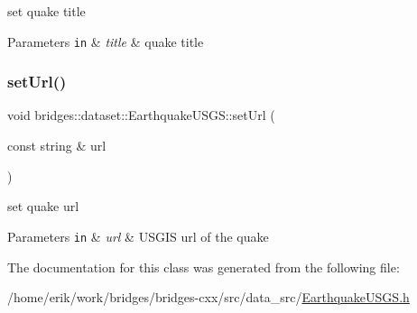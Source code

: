 set quake title 


\begin{DoxyParams}[1]{Parameters}
\mbox{\tt in}  & {\em title} & quake title \\
\hline
\end{DoxyParams}
\mbox{\label{classbridges_1_1dataset_1_1_earthquake_u_s_g_s_aecb3cb7e4dba2315fed2a4a316a1fac9}} 
\subsubsection{\texorpdfstring{set\+Url()}{setUrl()}}
{\footnotesize\ttfamily void bridges\+::dataset\+::\+Earthquake\+U\+S\+G\+S\+::set\+Url (\begin{DoxyParamCaption}\item[{const string \&}]{url }\end{DoxyParamCaption})\hspace{0.3cm}{\ttfamily [inline]}}



set quake url 


\begin{DoxyParams}[1]{Parameters}
\mbox{\tt in}  & {\em url} & U\+S\+G\+IS url of the quake \\
\hline
\end{DoxyParams}


The documentation for this class was generated from the following file\+:\begin{DoxyCompactItemize}
\item 
/home/erik/work/bridges/bridges-\/cxx/src/data\+\_\+src/\hyperlink{_earthquake_u_s_g_s_8h}{Earthquake\+U\+S\+G\+S.\+h}\end{DoxyCompactItemize}
